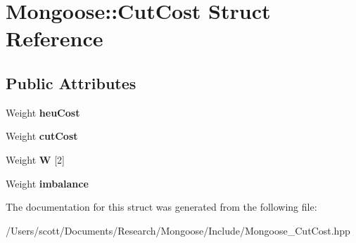 \hypertarget{struct_mongoose_1_1_cut_cost}{}\section{Mongoose\+:\+:Cut\+Cost Struct Reference}
\label{struct_mongoose_1_1_cut_cost}
\subsection*{Public Attributes}
\begin{DoxyCompactItemize}
\item 
\hypertarget{struct_mongoose_1_1_cut_cost_a8e77b912ee0a879e9db9c7f325ef7195}{}\label{struct_mongoose_1_1_cut_cost_a8e77b912ee0a879e9db9c7f325ef7195} 
Weight {\bfseries heu\+Cost}
\item 
\hypertarget{struct_mongoose_1_1_cut_cost_a2d232726628efbdd9f76f9dfa963066d}{}\label{struct_mongoose_1_1_cut_cost_a2d232726628efbdd9f76f9dfa963066d} 
Weight {\bfseries cut\+Cost}
\item 
\hypertarget{struct_mongoose_1_1_cut_cost_ae2609bea3d7bbfc6fd28e038b3937f36}{}\label{struct_mongoose_1_1_cut_cost_ae2609bea3d7bbfc6fd28e038b3937f36} 
Weight {\bfseries W} \mbox{[}2\mbox{]}
\item 
\hypertarget{struct_mongoose_1_1_cut_cost_a70ddd2c12e1c220725e3b50f956be42d}{}\label{struct_mongoose_1_1_cut_cost_a70ddd2c12e1c220725e3b50f956be42d} 
Weight {\bfseries imbalance}
\end{DoxyCompactItemize}


The documentation for this struct was generated from the following file\+:\begin{DoxyCompactItemize}
\item 
/\+Users/scott/\+Documents/\+Research/\+Mongoose/\+Include/Mongoose\+\_\+\+Cut\+Cost.\+hpp\end{DoxyCompactItemize}
